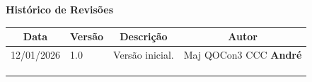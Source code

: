 \begin{table}[h]
	\begin{center}
	    \textbf{\Huge{Histórico de Revisões}}
	\end{center}
    \centering
	\begin{tabular}{|p{3cm}|p{1.5cm}|p{7.5cm}|p{3.2cm}|}
		\hline \multicolumn{1}{|c|}{\textbf{Data}} & \multicolumn{1}{|c|}{\textbf{Versão}} &
			\multicolumn{1}{|c|}{\textbf{Descrição}} & \multicolumn{1}{|c|}{\textbf{Autor}} \\ \hline
		12/01/2026 & 1.0 & Versão inicial. & Maj QOCon3 CCC \textbf{André} \\ \hline
		& & & \\ \hline
		& & & \\ \hline
		& & & \\ \hline
	\end{tabular}
\end{table}